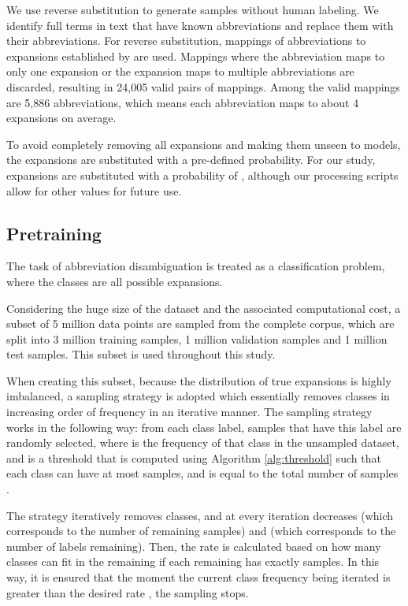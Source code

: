 \documentclass[11pt,a4paper]{article}
\begin{document}
We use reverse substitution \cite{Skreta2019TrainingDisambiguation} to generate samples without human labeling. We identify full terms in text that have known abbreviations and replace them with their abbreviations. For reverse substitution, mappings of abbreviations to expansions established by \citet{Zhou2006ADAM:MEDLINE} are used. Mappings where the abbreviation maps to only one expansion or the expansion maps to multiple abbreviations are discarded, resulting in 24,005 valid pairs of mappings. Among the valid mappings are 5,886 abbreviations, which means each abbreviation maps to about 4 expansions on average. 

To avoid completely removing all expansions and making them unseen to models, the expansions are substituted with a pre-defined probability. For our study, expansions are substituted with a probability of , although our processing scripts allow for other values for future use. 

\subsection{Pretraining}

The task of abbreviation disambiguation is treated as a classification problem, where the classes are all possible expansions. 

Considering the huge size of the dataset and the associated computational cost, a subset of 5 million data points are sampled from the complete corpus, which are split into 3 million training samples, 1 million validation samples and 1 million test samples. This subset is used throughout this study.

When creating this subset, because the distribution of true expansions is highly imbalanced, a sampling strategy is adopted which essentially removes classes in increasing order of frequency in an iterative manner. The sampling strategy works in the following way: from each class label,  samples that have this label are randomly selected, where  is the frequency of that class in the unsampled dataset, and  is a threshold that is computed using Algorithm \ref{alg:threshold} such that each class can have at most  samples, and  is equal to the total number of samples .

The strategy iteratively removes classes, and at every iteration decreases  (which corresponds to the number of remaining samples) and  (which corresponds to the number of labels remaining). Then, the rate  is calculated based on how many classes  can fit in the remaining  if each remaining  has exactly  samples. In this way, it is ensured that the moment the current class frequency  being iterated is greater than the desired rate , the sampling stops.
\end{document}
